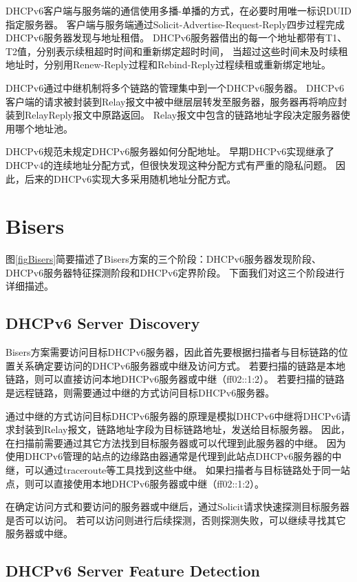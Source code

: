 \documentclass[UTF8]{article}
\begin{document}
DHCPv6客户端与服务端的通信使用多播-单播的方式，在必要时用唯一标识DUID指定服务器。
客户端与服务端通过Solicit-Advertise-Request-Reply四步过程完成DHCPv6服务器发现与地址租借。
DHCPv6服务器借出的每一个地址都带有T1、T2值，分别表示续租超时时间和重新绑定超时时间，
当超过这些时间未及时续租地址时，分别用Renew-Reply过程和Rebind-Reply过程续租或重新绑定地址。

DHCPv6通过中继机制将多个链路的管理集中到一个DHCPv6服务器。
DHCPv6客户端的请求被封装到Relay报文中被中继层层转发至服务器，服务器再将响应封装到RelayReply报文中原路返回。
Relay报文中包含的链路地址字段决定服务器使用哪个地址池。

DHCPv6规范未规定DHCPv6服务器如何分配地址。
早期DHCPv6实现继承了DHCPv4的连续地址分配方式，但很快发现这种分配方式有严重的隐私问题。
因此，后来的DHCPv6实现大多采用随机地址分配方式。

\section{Bisers}

图\ref{figBisers}简要描述了Bisers方案的三个阶段：DHCPv6服务器发现阶段、DHCPv6服务器特征探测阶段和DHCPv6定界阶段。
下面我们对这三个阶段进行详细描述。

\subsection{DHCPv6 Server Discovery}

Bisers方案需要访问目标DHCPv6服务器，因此首先要根据扫描者与目标链路的位置关系确定要访问的DHCPv6服务器或中继及访问方式。
若要扫描的链路是本地链路，则可以直接访问本地DHCPv6服务器或中继（ff02::1:2）。
若要扫描的链路是远程链路，则需要通过中继的方式访问目标DHCPv6服务器。

通过中继的方式访问目标DHCPv6服务器的原理是模拟DHCPv6中继将DHCPv6请求封装到Relay报文，链路地址字段为目标链路地址，发送给目标服务器。
因此，在扫描前需要通过其它方法找到目标服务器或可以代理到此服务器的中继。
因为使用DHCPv6管理的站点的边缘路由器通常是代理到此站点DHCPv6服务器的中继，可以通过traceroute等工具找到这些中继。
如果扫描者与目标链路处于同一站点，则可以直接使用本地DHCPv6服务器或中继（ff02::1:2）。

在确定访问方式和要访问的服务器或中继后，通过Solicit请求快速探测目标服务器是否可以访问。
若可以访问则进行后续探测，否则探测失败，可以继续寻找其它服务器或中继。

\subsection{DHCPv6 Server Feature Detection}
\end{document}
